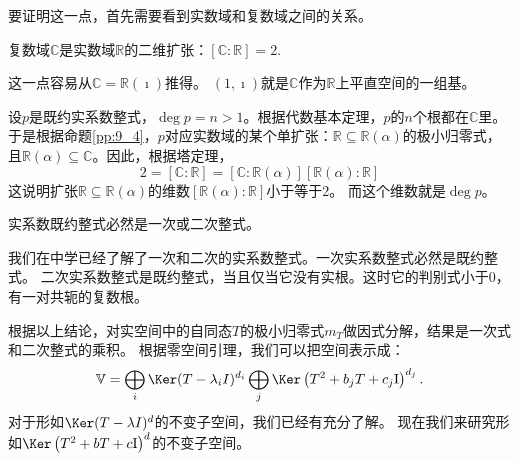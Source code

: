 \documentclass[12pt,UTF8,fontset=none]{ctexbook}
\begin{document}
要证明这一点，首先需要看到实数域和复数域之间的关系。
\begin{pp}\label{pp:9_9}
    复数域$\mathbb{C}$是实数域$\mathbb{R}$的二维扩张：$[\mathbb{C} : \mathbb{R}] = 2$.
\end{pp}
这一点容易从$\mathbb{C} = \mathbb{R}(\imath )$推得。
$(1, \imath )$就是$\mathbb{C}$作为$\mathbb{R}$上平直空间的一组基。

设$p$是既约实系数整式，$\deg p = n > 1$。根据代数基本定理，$p$的$n$个根都在$\mathbb{C}$里。
于是根据命题\ref{pp:9_4}，$p$对应实数域的某个单扩张：$\mathbb{R}\subseteq\mathbb{R}(\alpha)$的极小归零式，
且$\mathbb{R}(\alpha)\subseteq\mathbb{C}$。因此，根据塔定理，
$$ 2 = [\mathbb{C} : \mathbb{R}] = [\mathbb{C} : \mathbb{R}(\alpha)] [\mathbb{R}(\alpha) : \mathbb{R}]$$
这说明扩张$\mathbb{R}\subseteq\mathbb{R}(\alpha)$的维数$[\mathbb{R}(\alpha) : \mathbb{R}]$小于等于2。
而这个维数就是$\deg p$。
\begin{pp}\label{pp:9_10}
    实系数既约整式必然是一次或二次整式。
\end{pp}
我们在中学已经了解了一次和二次的实系数整式。一次实系数整式必然是既约整式。
二次实系数整式是既约整式，当且仅当它没有实根。这时它的判别式小于0，有一对共轭的复数根。

根据以上结论，对实空间中的自同态$T$的极小归零式$m_T$做因式分解，结果是一次式和二次整式的乘积。
根据零空间引理，我们可以把空间表示成：
$$ \mathbb{V} = \bigoplus_{i}\Ker (T - \lambda_i I)^{d_i} \bigoplus_{j} \Ker \left(T^2 + b_jT + c_j\mathrm{I}\right)^{d_j} . $$
对于形如$\Ker (T - \lambda I)^{d}$的不变子空间，我们已经有充分了解。
现在我们来研究形如$\Ker \left(T^2 + b T + c\mathrm{I}\right)^{d}$的不变子空间。
\end{document}
